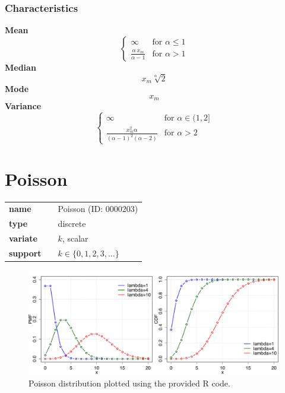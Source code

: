 \subsubsection*{Characteristics}
\smallskip \noindent \hspace{.2cm} \textbf{Mean} 
\begin{equation*}\begin{cases}
\infty & \text{for }\alpha\le 1 \\
\frac{\alpha\,x_m}{\alpha-1} & \text{for }\alpha>1
\end{cases}\end{equation*}
\smallskip \noindent \hspace{.2cm} \textbf{Median} 
\begin{equation*}x_m \sqrt[\alpha]{2}\end{equation*}
\smallskip \noindent \hspace{.2cm} \textbf{Mode} 
\begin{equation*}x_m\end{equation*}
\smallskip \noindent \hspace{.2cm} \textbf{Variance} 
\begin{equation*}\begin{cases}
     \infty & \text{for }\alpha\in(1,2] \\
     \frac{x_m^2\alpha}{(\alpha-1)^2(\alpha-2)} & \text{for }\alpha>2
   \end{cases}\end{equation*}
\smallskip
\section*{Poisson} 

  \bigskip 

\begin{tabular}{p{2cm}cl}
\textbf{name} & & Poisson (ID: 0000203)\\ 
 
\textbf{type} & & discrete \\ 

\textbf{variate} & & $k$, scalar \\ 

\textbf{support} & & $k \in \{0,1,2,3,\dots\}$
\end{tabular}

\begin{figure}[ht!]
\centering
  \includegraphics[width=140mm]{pics/Poisson.pdf}
 \caption{Poisson distribution plotted using the provided R code.}
 \label{fig:Poisson}
\end{figure}

